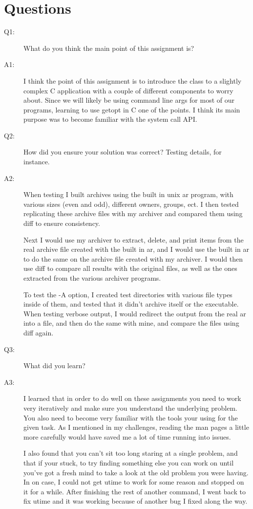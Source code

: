 \documentclass[letterpaper,10pt]{article}
\begin{document}
\section{Questions}
\begin{description}
\item[Q1:] What do you think the main point of this assignment is?
\item[A1:] I think the point of this assignment is to introduce the class to a
slightly complex C application with a couple of different components to worry
about. Since we will likely be using command line args for most of our
programs, learning to use getopt in C one of the points. I think its main
purpose was to become familiar with the system call API.

\item[Q2:] How did you ensure your solution was correct? Testing details, for instance.
\item[A2:] When testing I built archives using the built in unix ar program,
with various sizes (even and odd), different owners, groups, ect. I then tested
replicating these archive files with my archiver and compared them using diff
to ensure consistency.

Next I would use my archiver to extract, delete, and print items from the real
archive file created with the built in ar, and I would use the built in ar to
do the same on the archive file created with my archiver. I would then use diff
to compare all results with the original files, as well as the ones extracted
from the various archiver programs.

To test the -A option, I created test directories with various file types
inside of them, and tested that it didn't archive itself or the executable.
When testing verbose output, I would redirect the output from the real ar into
a file, and then do the same with mine, and compare the files using diff again.

\item[Q3:] What did you learn?
\item[A3:] I learned that in order to do well on these assignments you need to
work very iteratively and make sure you understand the underlying problem. You
also need to become very familiar with the tools your using for the given task.
As I mentioned in my challenges, reading the man pages a little more carefully
would have saved me a lot of time running into issues.

I also found that you can't sit too long staring at a single problem, and that
if your stuck, to try finding something else you can work on until you've got a
fresh mind to take a look at the old problem you were having. In on case, I
could not get utime to work for some reason and stopped on it for a while.
After finishing the rest of another command, I went back to fix utime and it
was working because of another bug I fixed along the way.


\end{description}
\end{document}
